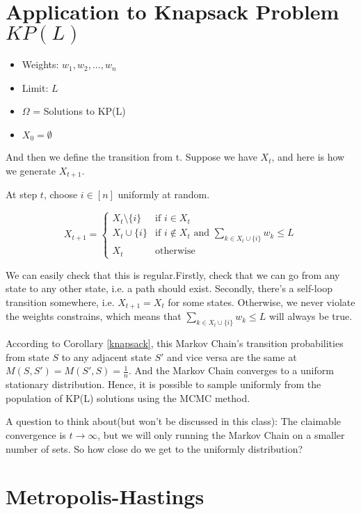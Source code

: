 \documentclass[twoside]{article}
\begin{document}
\section{Application to Knapsack Problem $KP(L)$}

\begin{itemize}
   \item Weights: $w_1,w_2, ..., w_n$
   \item Limit: $L$
   \item $\Omega$ = Solutions to KP(L)
   \item $X_0 = \emptyset$
\end{itemize}

And then we define the transition from t. Suppose we have $X_t$, and here is how we generate $X_{t+1}$.  

At step $t$, choose $i \in [n]$ uniformly at random.

$$
X_{t+1} = \begin{cases}
   X_t \setminus \{i\} & \text{if } i \in X_t \\
   X_t \cup \{i\} & \text{if } i \notin X_t \text{ and } \sum_{k \in X_t \cup \{i\}} w_k \leq L\\
   X_t & \text{otherwise}
\end{cases}
$$

We can easily check that this is regular.Firstly, check that we can go from any state to any other state, i.e. a path should exist. Secondly, there's a self-loop transition somewhere, i.e. $X_{t+1}=X_t$ for some states. Otherwise, we never violate the weights constrains, which means that $\sum_{k \in X_t \cup \{i\}} w_k \leq L $ will always be true.

According to Corollary \ref{knapsack}, this Markov Chain's transition probabilities from state $S$ to any adjacent state $S'$ and vice versa are the same at $M(S, S') = M(S', S) = \frac{1}{n}$. And the Markov Chain converges to a uniform stationary distribution. Hence, it is possible to sample uniformly from the population of KP(L) solutions using the MCMC method.

A question to think about(but won't be discussed in this class): The claimable convergence is $t \rightarrow \infty$, but we will only running the Markov Chain on a smaller number of sets. So how close do we get to the uniformly distribution?

\section{Metropolis-Hastings}
\end{document}
